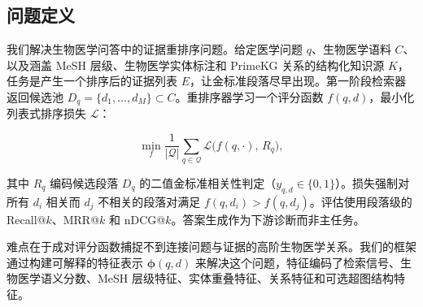 \subsection{问题定义}

我们解决生物医学问答中的证据重排序问题。给定医学问题 $q$、生物医学语料 $C$、以及涵盖 MeSH 层级、生物医学实体标注和 PrimeKG 关系的结构化知识源 $K$，任务是产生一个排序后的证据列表 $E$，让金标准段落尽早出现。第一阶段检索器返回候选池 $D_q = \{d_1,\ldots,d_M\} \subset C$。重排序器学习一个评分函数 $f(q,d)$，最小化列表式排序损失 $\mathcal{L}$：

\[
  \min_f \frac{1}{|\mathcal{Q}|}\sum_{q \in \mathcal{Q}} \mathcal{L}\big(f(q,\cdot),\, R_q\big),
\]

其中 $R_q$ 编码候选段落 $D_q$ 的二值金标准相关性判定（$y_{q,d} \in \{0,1\}$）。损失强制对所有 $d_i$ 相关而 $d_j$ 不相关的段落对满足 $f(q,d_i) > f(q,d_j)$。评估使用段落级的 Recall@$k$、MRR@$k$ 和 nDCG@$k$。答案生成作为下游诊断而非主任务。

难点在于成对评分函数捕捉不到连接问题与证据的高阶生物医学关系。我们的框架通过构建可解释的特征表示 $\boldsymbol{\phi}(q,d)$ 来解决这个问题，特征编码了检索信号、生物医学语义分数、MeSH 层级特征、实体重叠特征、关系特征和可选超图结构特征。
